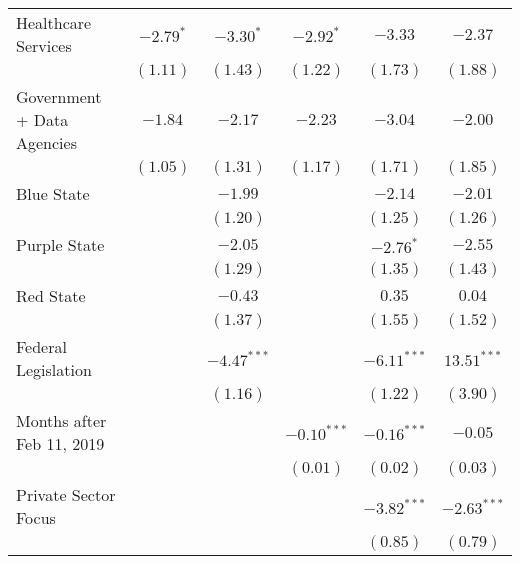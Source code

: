 \begin{table}
\begin{center}
\begin{tabular}{l c c c c c}
Healthcare Services                             & $-2.79^{*}$  & $-3.30^{*}$   & $-2.92^{*}$   & $-3.33$       & $-2.37$       \\
                                                  & $(1.11)$     & $(1.43)$      & $(1.22)$      & $(1.73)$      & $(1.88)$      \\
Government + Data Agencies                      & $-1.84$      & $-2.17$       & $-2.23$       & $-3.04$       & $-2.00$       \\
                                                  & $(1.05)$     & $(1.31)$      & $(1.17)$      & $(1.71)$      & $(1.85)$      \\
Blue State                                      &              & $-1.99$       &               & $-2.14$       & $-2.01$       \\
                                                  &              & $(1.20)$      &               & $(1.25)$      & $(1.26)$      \\
Purple State                                    &              & $-2.05$       &               & $-2.76^{*}$   & $-2.55$       \\
                                                  &              & $(1.29)$      &               & $(1.35)$      & $(1.43)$      \\
Red State                                       &              & $-0.43$       &               & $0.35$        & $0.04$        \\
                                                  &              & $(1.37)$      &               & $(1.55)$      & $(1.52)$      \\
Federal Legislation                             &              & $-4.47^{***}$ &               & $-6.11^{***}$ & $13.51^{***}$ \\
                                                  &              & $(1.16)$      &               & $(1.22)$      & $(3.90)$      \\
Months after Feb 11, 2019                       &              &               & $-0.10^{***}$ & $-0.16^{***}$ & $-0.05$       \\
                                                  &              &               & $(0.01)$      & $(0.02)$      & $(0.03)$      \\
Private Sector Focus                            &              &               &               & $-3.82^{***}$ & $-2.63^{***}$ \\
                                                  &              &               &               & $(0.85)$      & $(0.79)$      \\

\end{tabular}
\end{center}
\end{table}
